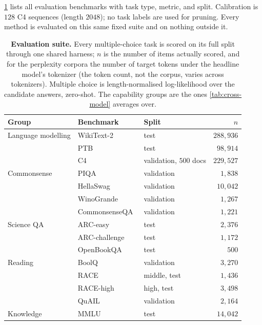\label{app:datasets}
\cref{tab:datasets} lists all evaluation benchmarks with task type, metric, and split. Calibration is
$128$ C4 sequences (length $2048$); no task labels are used for pruning. Every method is evaluated on
this same fixed suite and on nothing outside it.

\begin{table}[htbp]
\centering\caption{\textbf{Evaluation suite.} Every multiple-choice task is scored on its full split
through one shared harness; $n$ is the number of items actually scored, and for the perplexity corpora
the number of target tokens under the headline model's tokenizer (the token count, not the corpus,
varies across tokenizers). Multiple choice is length-normalised log-likelihood over the candidate
answers, zero-shot. The capability groups are the ones \cref{tab:cross-model} averages
over.}\label{tab:datasets}\footnotesize
\setlength{\tabcolsep}{5pt}
\begin{tabular}{lllr}
\toprule
\textbf{Group} & \textbf{Benchmark} & \textbf{Split} & $n$\\
\midrule
Language modelling & WikiText-2~\citep{merity2017wikitext} & test & $288{,}936$\\
 & PTB~\citep{marcus1993ptb} & test & $98{,}914$\\
 & C4~\citep{raffel2020c4} & validation, $500$ docs & $229{,}527$\\
\midrule
Commonsense & PIQA~\citep{bisk2020piqa} & validation & $1{,}838$\\
 & HellaSwag~\citep{zellers2019hellaswag} & validation & $10{,}042$\\
 & WinoGrande~\citep{sakaguchi2021winogrande} & validation & $1{,}267$\\
 & CommonsenseQA~\citep{talmor2019commonsenseqa} & validation & $1{,}221$\\
\midrule
Science QA & ARC-easy~\citep{clark2018arc} & test & $2{,}376$\\
 & ARC-challenge~\citep{clark2018arc} & test & $1{,}172$\\
 & OpenBookQA~\citep{mihaylov2018openbookqa} & test & $500$\\
\midrule
Reading & BoolQ~\citep{clark2019boolq} & validation & $3{,}270$\\
 & RACE~\citep{lai2017race} & middle, test & $1{,}436$\\
 & RACE-high~\citep{lai2017race} & high, test & $3{,}498$\\
 & QuAIL~\citep{rogers2020quail} & validation & $2{,}164$\\
\midrule
Knowledge & MMLU~\citep{hendrycks2021mmlu} & test & $14{,}042$\\
\bottomrule
\end{tabular}
\end{table}
